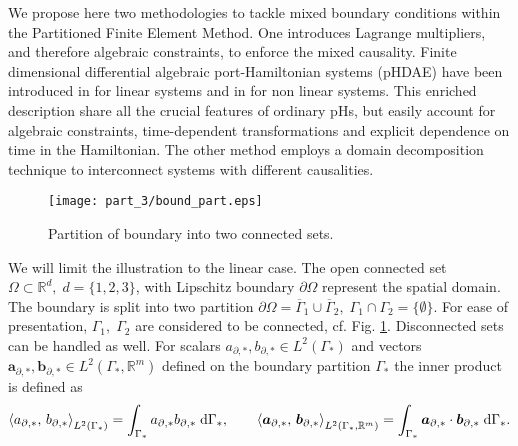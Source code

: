 We propose here two methodologies to tackle mixed boundary conditions within the Partitioned Finite Element Method. One introduces Lagrange multipliers, and therefore algebraic constraints, to enforce the mixed causality. Finite dimensional differential algebraic port-Hamiltonian systems (pHDAE) have been introduced in \cite{beattie2018linear} for linear systems and in \cite{morandin2019} for non linear systems. This enriched description share all the crucial features of ordinary pHs, but easily account for algebraic constraints, time-dependent transformations and explicit dependence on time in the Hamiltonian. The other method employs a domain decomposition technique to interconnect systems with different causalities. \\

\begin{figure}[tb]
	\centering
	\texttt{[image: part\_3/bound\_part.eps]}
	\caption{Partition of boundary into two connected sets.}
	\label{fig:bound_part}
\end{figure}

We will limit the illustration to the linear case. The open connected set $\Omega \subset \mathbb{R}^d, \; d=\{1,2,3\}$, with Lipschitz boundary $\partial\Omega$ represent the spatial domain. The boundary is split into two partition $\partial\Omega = \overline{\Gamma}_1 \cup \overline{\Gamma}_2, \; \Gamma_1 \cap \Gamma_2 = \{\emptyset\}$. For ease of presentation, $\Gamma_1, \; \Gamma_2$ are considered to be connected, cf. Fig. \ref{fig:bound_part}. Disconnected sets can be handled as well. For scalars ${a}_{\partial, *}, {b}_{\partial, *} \in L^2(\Gamma_*)$ and  vectors  $\bm{a}_{\partial, *}, \bm{b}_{\partial, *} \in L^2(\Gamma_*, \mathbb{R}^m)$ defined on the boundary partition $\Gamma_*$ the inner product is defined as
\begin{equation}
\inner[L^2(\Gamma_*)]{a_{\partial, *}}{b_{\partial, *}} = \int_{\Gamma_*} a_{\partial, *} b_{\partial, *} \d{\Gamma_*}, \qquad \inner[L^2(\Gamma_*, \mathbb{R}^m)]{\bm{a}_{\partial, *}}{\bm{b}_{\partial, *}} = \int_{\Gamma_*} \bm{a}_{\partial, *} \cdot \bm{b}_{\partial, *} \d{\Gamma_*}.  
\end{equation}   

